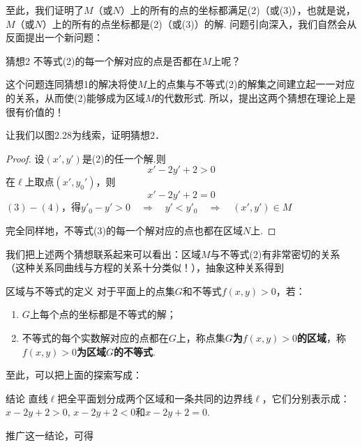 至此，我们证明了$M$（或$N$）上的所有的点的坐标都满足(2)（或(3)），也就是说，$M$（或$N$）上的所有的点坐标都是(2)（或(3)）的解. 问题引向深入，我们自然会从反面提出一个新问题：

\begin{thm}
    {猜想2} 不等式(2)的每一个解对应的点是否都在$M$上呢？
\end{thm}

\begin{remark}
     这个问题连同猜想1的解决将使$M$上的点集与不等式(2)的解集之间建立起一一对应的关系，从而使(2)能够成为区域$M$的代数形式. 所以，提出这两个猜想在理论上是很有价值的！
\end{remark}

让我们以图2.28为线索，证明猜想2．

\begin{proof}
设$(x',y')$是(2)的任一个解.则
\begin{equation}
    x'-2y'+2>0 \tag{3}
\end{equation}
在$\ell$上取点$(x',y_0')$，则
\begin{equation}
    x'-2y'+2=0 \tag{4}
\end{equation}
$(3)-(4)$，得$y'_0-y'>0 \quad\Rightarrow\quad y'<y'_0 \quad\Rightarrow \quad (x',y')\in M$

完全同样地，不等式(3)的每一个解对应的点也都在区域$N$上.
\end{proof}

我们把上述两个猜想联系起来可以看出：区域$M$与不等式(2)有非常密切的关系（这种关系同曲线与方程的关系十分类似！），抽象这种关系得到

\begin{thm}{区域与不等式的定义}
    对于平面上的点集$G$和不等式$f(x,y)>0$，若：
\begin{enumerate}
    \item $G$上每个点的坐标都是不等式的解；
    \item 不等式的每个实数解对应的点都在$G$上，称点集\textbf{$G$为$f(x,y)>0$的区域}，称\textbf{$f(x,y)>0$为区域$G$的不等式}.
\end{enumerate}
\end{thm}

至此，可以把上面的探索写成：

\begin{thm}
{结论} 直线$\ell$把全平面划分成两个区域和一条共同的边界线$\ell$，它们分别表示成：
$x-2y+2>0$, $x-2y+2<0$和$x-2y+2=0$.    
\end{thm}

推广这一结论，可得

